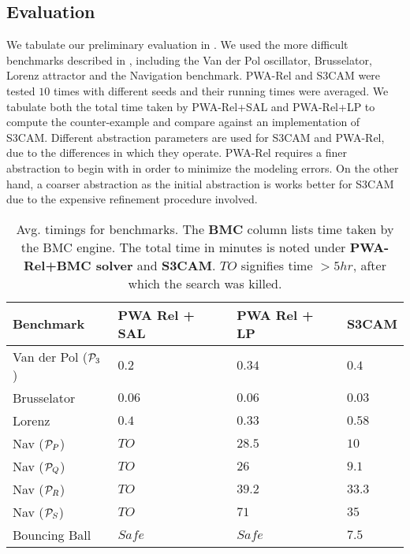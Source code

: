 \subsection{Evaluation}
We tabulate our preliminary evaluation in . We used
the more difficult benchmarks described in \cite{zutshi2014multiple},
including the Van der Pol oscillator, Brusselator, Lorenz attractor
and the Navigation benchmark. PWA-Rel and S3CAM were tested $10$ times
with different seeds and their running times were averaged. We tabulate
both the total time taken by PWA-Rel+SAL and PWA-Rel+LP to compute the
counter-example and compare against an implementation of S3CAM.
Different abstraction parameters are used for S3CAM and PWA-Rel, due
to the differences in which they operate. PWA-Rel requires a finer
abstraction to begin with in order to minimize the modeling errors.
On the other hand, a coarser abstraction as the initial abstraction is
works better for S3CAM due to the expensive refinement procedure
involved.

\begin{table}[!htbp]
\centering
\caption{Avg. timings for benchmarks. The \textbf{BMC} column lists
time taken by the BMC engine. The total time in minutes is noted under
    \textbf{PWA-Rel+BMC solver} and \textbf{S3CAM}.
$TO$ signifies time $>5hr$, after which the search was killed.}
\label{tab:res-rel}
\begin{tabular}{@{}llll@{}}
\toprule
    Benchmark & PWA Rel + SAL & PWA Rel + LP & S3CAM\\
\midrule
    Van der Pol ($\mathcal{P}_3$)   &$0.2$ & $0.34$ & $0.4$\\
    Brusselator               &$0.06$ & $0.06$ & $0.03$\\
    Lorenz                    &$0.4$ & $0.33$ & $0.58$\\
    Nav ($\mathcal{P}_P$)           &$TO$ & $28.5$  & $10$ \\%
    Nav ($\mathcal{P}_Q$)           &$TO$ & $26$   & $9.1$ \\%
    Nav ($\mathcal{P}_R$)           &$TO$ & $39.2$  & $33.3$\\
    Nav ($\mathcal{P}_S$)           &$TO$ & $71$  & $35$\\
    Bouncing Ball             &$Safe$ & $Safe$  & $7.5$\\

\bottomrule
\end{tabular}
\end{table}

